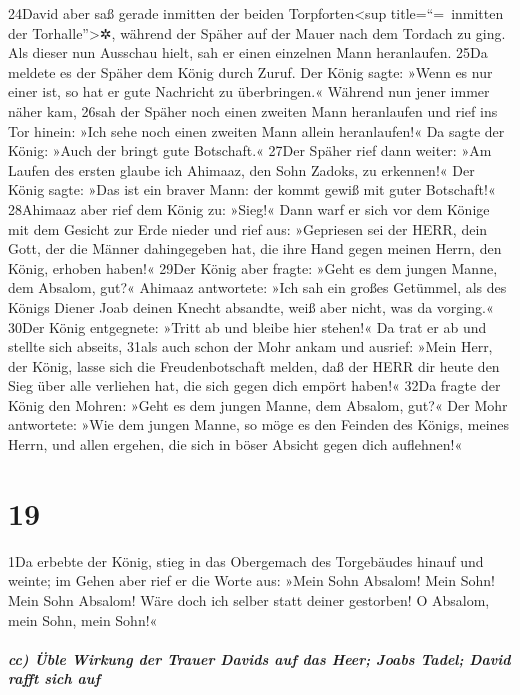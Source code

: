 24David aber saß gerade inmitten der beiden Torpforten\textless sup
title=``=~inmitten der Torhalle''\textgreater✲, während der Späher auf
der Mauer nach dem Tordach zu ging. Als dieser nun Ausschau hielt, sah
er einen einzelnen Mann heranlaufen. 25Da meldete es der Späher dem
König durch Zuruf. Der König sagte: »Wenn es nur einer ist, so hat er
gute Nachricht zu überbringen.« Während nun jener immer näher kam, 26sah
der Späher noch einen zweiten Mann heranlaufen und rief ins Tor hinein:
»Ich sehe noch einen zweiten Mann allein heranlaufen!« Da sagte der
König: »Auch der bringt gute Botschaft.« 27Der Späher rief dann weiter:
»Am Laufen des ersten glaube ich Ahimaaz, den Sohn Zadoks, zu erkennen!«
Der König sagte: »Das ist ein braver Mann: der kommt gewiß mit guter
Botschaft!« 28Ahimaaz aber rief dem König zu: »Sieg!« Dann warf er sich
vor dem Könige mit dem Gesicht zur Erde nieder und rief aus: »Gepriesen
sei der HERR, dein Gott, der die Männer dahingegeben hat, die ihre Hand
gegen meinen Herrn, den König, erhoben haben!« 29Der König aber fragte:
»Geht es dem jungen Manne, dem Absalom, gut?« Ahimaaz antwortete: »Ich
sah ein großes Getümmel, als des Königs Diener Joab deinen Knecht
absandte, weiß aber nicht, was da vorging.« 30Der König entgegnete:
»Tritt ab und bleibe hier stehen!« Da trat er ab und stellte sich
abseits, 31als auch schon der Mohr ankam und ausrief: »Mein Herr, der
König, lasse sich die Freudenbotschaft melden, daß der HERR dir heute
den Sieg über alle verliehen hat, die sich gegen dich empört haben!«
32Da fragte der König den Mohren: »Geht es dem jungen Manne, dem
Absalom, gut?« Der Mohr antwortete: »Wie dem jungen Manne, so möge es
den Feinden des Königs, meines Herrn, und allen ergehen, die sich in
böser Absicht gegen dich auflehnen!«

\hypertarget{section-18}{%
\section{19}\label{section-18}}

1Da erbebte der König, stieg in das Obergemach des Torgebäudes hinauf
und weinte; im Gehen aber rief er die Worte aus: »Mein Sohn Absalom!
Mein Sohn! Mein Sohn Absalom! Wäre doch ich selber statt deiner
gestorben! O Absalom, mein Sohn, mein Sohn!«

\hypertarget{cc-uxfcble-wirkung-der-trauer-davids-auf-das-heer-joabs-tadel-david-rafft-sich-auf}{%
\subparagraph{cc) Üble Wirkung der Trauer Davids auf das Heer; Joabs
Tadel; David rafft sich
auf}\label{cc-uxfcble-wirkung-der-trauer-davids-auf-das-heer-joabs-tadel-david-rafft-sich-auf}}

